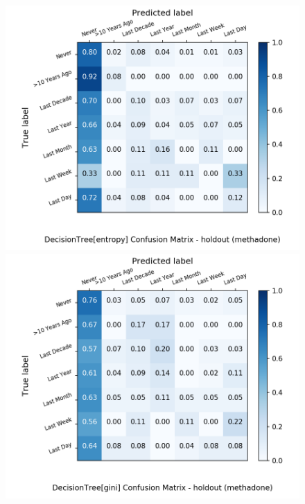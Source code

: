 \begin{figure}[H]
	\centering
	\begin{minipage}[b]{0.32\textwidth}
		\includegraphics[width=1.1\textwidth]{Plots/drugs/methadone_DecisionTree_entropy_balance_False_holdout.png}
	\end{minipage}
	\begin{minipage}[b]{0.32\textwidth}
		\includegraphics[width=1.1\textwidth]{Plots/drugs/methadone_DecisionTree_gini_balance_False_holdout.png}
	\end{minipage}

\end{figure}
